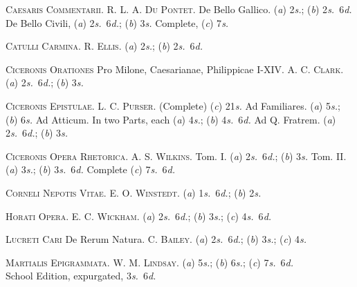 \documentclass[12pt,oneside]{book}[2021/10/04]
\newenvironment{advlist}{
  \begin{description}[leftmargin=1em, parsep=0.2ex, listparindent=1em,]
}{\end{description}}
\newcommand{\¬}{\hphantom{0}}
\begin{document}
\begin{advlist}
\item[\mdseries\textsc{Caesaris Commentarii.}] \textsc{R. L.
A. Du Pontet.} De Bello Gallico.
(\textit{a}) 2\textit{s.}; (\textit{b}) 2\textit{s.}\ 6\textit{d.} De Bello Civili,
(\textit{a}) 2\textit{s.}\ 6\textit{d.}; (\textit{b}) 3\textit{s.} Complete, (\textit{c}) 7\textit{s.}

\item[\mdseries\textsc{Catulli Carmina.}] \textsc{R. Ellis.}
(\textit{a}) 2\textit{s.}; (\textit{b}) 2\textit{s.}\ 6\textit{d.}

\item[\mdseries\textsc{Ciceronis Orationes}] Pro Milone,
Caesarianae, Philippicae I-XIV.
\textsc{A. C. Clark.} (\textit{a}) 2\textit{s.}\ 6\textit{d.}; (\textit{b}) 3\textit{s.}

\item[\mdseries\textsc{Ciceronis Epistulae.}] \textsc{L. C.
Purser.} (Complete) (\textit{c}) 21\textit{s.} Ad
Familiares. (\textit{a}) 5\textit{s.}; (\textit{b}) 6\textit{s.} Ad
Atticum. In two Parts, each (\textit{a})
4\textit{s.}; (\textit{b}) 4\textit{s.}\ 6\textit{d.} Ad Q. Fratrem.
(\textit{a}) 2\textit{s.}\ 6\textit{d.}; (\textit{b}) 3\textit{s.}

\item[\mdseries\textsc{Ciceronis Opera Rhetorica.}]
\textsc{A. S. Wilkins.} Tom. I. (\textit{a})
2\textit{s.}\ 6\textit{d.}; (\textit{b}) 3\textit{s.} Tom. II. (\textit{a}) 3\textit{s.};
(\textit{b}) 3\textit{s.}\ 6\textit{d.} Complete (\textit{c}) 7\textit{s.}\ 6\textit{d.}

\item[\mdseries\textsc{Corneli Nepotis Vitae.}] \textsc{E. O.
Winstedt.} (\textit{a}) 1\textit{s.}\ 6\textit{d.}; (\textit{b}) 2\textit{s.}

\item[\mdseries\textsc{Horati Opera.}] \textsc{E. C. Wickham.}
(\textit{a}) 2\textit{s.}\ 6\textit{d.}; (\textit{b}) 3\textit{s.}; (\textit{c}) 4\textit{s.}\ 6\textit{d.}

\item[\mdseries\textsc{Lucreti Cari}] De Rerum Natura.
\textsc{C. Bailey.} (\textit{a}) 2\textit{s.}\ 6\textit{d.}; (\textit{b}) 3\textit{s.}; (\textit{c}) 4\textit{s.}

\item[\mdseries\textsc{Martialis Epigrammata.}] \textsc{W.
M. Lindsay.} (\textit{a}) 5\textit{s.}; (\textit{b}) 6\textit{s.};
(\textit{c}) 7\textit{s.}\ 6\textit{d.}\\
School Edition, expurgated, 3\textit{s.}\ 6\textit{d.}


\end{advlist}
\end{document}
